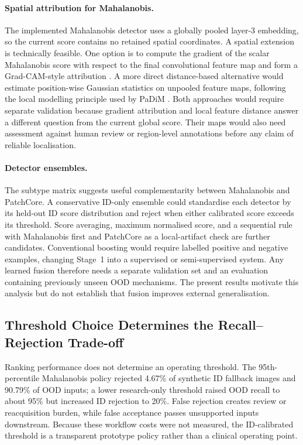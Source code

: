 \documentclass[fleqn,12pt]{olplainarticle}
\begin{document}
\paragraph{Spatial attribution for Mahalanobis.}
The implemented Mahalanobis detector uses a globally pooled layer-3 embedding,
so the current score contains no retained spatial coordinates. A spatial
extension is technically feasible. One option is to compute the gradient of
the scalar Mahalanobis score with respect to the final convolutional feature
map and form a Grad-CAM-style attribution \cite{selvaraju2017grad}. A more
direct distance-based alternative would estimate position-wise Gaussian
statistics on unpooled feature maps, following the local modelling principle
used by PaDiM \cite{defard2021padim}. Both approaches would require separate
validation because gradient attribution and local feature distance answer a
different question from the current global score. Their maps would also need
assessment against human review or region-level annotations before any claim
of reliable localisation.

\paragraph{Detector ensembles.}
The subtype matrix suggests useful complementarity between Mahalanobis and
PatchCore. A conservative ID-only ensemble could standardise each detector by
its held-out ID score distribution and reject when either calibrated score
exceeds its threshold. Score averaging, maximum normalised score, and a
sequential rule with Mahalanobis first and PatchCore as a local-artifact check
are further candidates. Conventional boosting would require labelled positive
and negative examples, changing Stage~1 into a supervised or semi-supervised
system. Any learned fusion therefore needs a separate validation set and an
evaluation containing previously unseen OOD mechanisms. The present results
motivate this analysis but do not establish that fusion improves external
generalisation.

\subsection{Threshold Choice Determines the Recall--Rejection Trade-off}
\label{subsec:discussion_thresholds}

Ranking performance does not determine an operating threshold. The 95th-percentile Mahalanobis policy rejected 4.67\% of synthetic ID fallback images and 90.79\% of OOD inputs; a lower research-only threshold raised OOD recall to about 95\% but increased ID rejection to 20\%. False rejection creates review or reacquisition burden, while false acceptance passes unsupported inputs downstream. Because these workflow costs were not measured, the ID-calibrated threshold is a transparent prototype policy rather than a clinical operating point.
\end{document}
